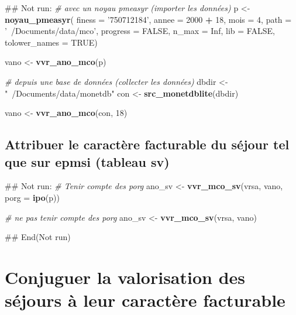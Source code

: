 \documentclass[]{book}
\newenvironment{Shaded}{\begin{snugshade}}{\end{snugshade}}
\newcommand{\KeywordTok}[1]{\textcolor[rgb]{0.13,0.29,0.53}{\textbf{#1}}}
\newcommand{\DataTypeTok}[1]{\textcolor[rgb]{0.13,0.29,0.53}{#1}}
\newcommand{\DecValTok}[1]{\textcolor[rgb]{0.00,0.00,0.81}{#1}}
\newcommand{\StringTok}[1]{\textcolor[rgb]{0.31,0.60,0.02}{#1}}
\newcommand{\CommentTok}[1]{\textcolor[rgb]{0.56,0.35,0.01}{\textit{#1}}}
\newcommand{\OtherTok}[1]{\textcolor[rgb]{0.56,0.35,0.01}{#1}}
\newcommand{\OperatorTok}[1]{\textcolor[rgb]{0.81,0.36,0.00}{\textbf{#1}}}
\newcommand{\NormalTok}[1]{#1}
\begin{document}
\begin{Shaded}
\begin{Highlighting}[]
\NormalTok{## Not run: }
\CommentTok{# avec un noyau pmeasyr (importer les données)}
\NormalTok{p <-}\StringTok{ }\KeywordTok{noyau_pmeasyr}\NormalTok{(}
  \DataTypeTok{finess   =} \StringTok{'750712184'}\NormalTok{,}
  \DataTypeTok{annee    =} \DecValTok{2000} \OperatorTok{+}\StringTok{ }\DecValTok{18}\NormalTok{,}
  \DataTypeTok{mois     =} \DecValTok{4}\NormalTok{,}
  \DataTypeTok{path     =} \StringTok{'~/Documents/data/mco'}\NormalTok{,}
  \DataTypeTok{progress =} \OtherTok{FALSE}\NormalTok{,}
  \DataTypeTok{n_max    =} \OtherTok{Inf}\NormalTok{,}
  \DataTypeTok{lib      =} \OtherTok{FALSE}\NormalTok{,}
  \DataTypeTok{tolower_names =} \OtherTok{TRUE}\NormalTok{)}

\NormalTok{vano <-}\StringTok{ }\KeywordTok{vvr_ano_mco}\NormalTok{(p)}

\CommentTok{# depuis une base de données (collecter les données)}
\NormalTok{dbdir <-}\StringTok{ "~/Documents/data/monetdb"}
\NormalTok{con <-}\StringTok{ }\KeywordTok{src_monetdblite}\NormalTok{(dbdir)}

\NormalTok{vano <-}\StringTok{ }\KeywordTok{vvr_ano_mco}\NormalTok{(con, }\DecValTok{18}\NormalTok{)}
\end{Highlighting}
\end{Shaded}

\subsection{Attribuer le caractère facturable du séjour tel que sur
epmsi (tableau
sv)}\label{attribuer-le-caractere-facturable-du-sejour-tel-que-sur-epmsi-tableau-sv}

\begin{Shaded}
\begin{Highlighting}[]
\NormalTok{## Not run: }
\CommentTok{# Tenir compte des porg}
\NormalTok{ano_sv <-}\StringTok{ }\KeywordTok{vvr_mco_sv}\NormalTok{(vrsa, vano, }\DataTypeTok{porg =} \KeywordTok{ipo}\NormalTok{(p))}

\CommentTok{# ne pas tenir compte des porg}
\NormalTok{ano_sv <-}\StringTok{ }\KeywordTok{vvr_mco_sv}\NormalTok{(vrsa, vano)}

\NormalTok{## End(Not run)}
\end{Highlighting}
\end{Shaded}

\section{Conjuguer la valorisation des séjours à leur caractère
facturable}\label{conjuguer-la-valorisation-des-sejours-a-leur-caractere-facturable}
\end{document}
